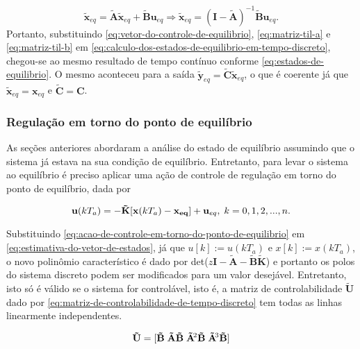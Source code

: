 \begin{equation}
    \label{eq:calculo-dos-estados-de-equilibrio-em-tempo-discreto}
    \mathbf{\tilde{x}}_{eq} = \mathbf{\tilde{A}}\mathbf{\tilde{x}}_{eq} + \mathbf{\tilde{B}}\mathbf{u}_{eq}
    \Rightarrow
    \mathbf{\tilde{x}}_{eq} = (\mathbf{I}-\mathbf{\tilde{A}})^{-1}\mathbf{\tilde{B}}\mathbf{u}_{eq}.
\end{equation} Portanto, substituindo \ref{eq:vetor-do-controle-de-equilibrio},
\ref{eq:matriz-til-a} e \ref{eq:matriz-til-b} em
\ref{eq:calculo-dos-estados-de-equilibrio-em-tempo-discreto}, chegou-se ao mesmo
resultado de tempo contínuo conforme \ref{eq:estados-de-equilibrio}. O mesmo
aconteceu para a saída $\mathbf{\tilde{y}}_{eq} =
\mathbf{\tilde{C}}\mathbf{\tilde{x}}_{eq}$, o que é coerente já que
$\mathbf{\tilde{x}}_{eq} = \mathbf{x}_{eq}$ e $\mathbf{\tilde{C}} = \mathbf{C}$.

\subsubsection{Regulação em torno do ponto de equilíbrio}
\label{subsub:regulacao-em-torno-do-ponto-de-equilibrio}

As seções anteriores abordaram a análise do estado de equilíbrio assumindo que o
sistema já estava na sua condição de equilíbrio. Entretanto, para levar o sistema
ao equilíbrio é preciso aplicar uma ação de controle de regulação em torno do
ponto de equilíbrio, dada por

\begin{equation}
    \label{eq:acao-de-controle-em-torno-do-ponto-de-equilibrio}
    \mathbf{u}(kT_a) = -\mathbf{\tilde{K}}[\mathbf{x}(kT_a) - \mathbf{x_{eq}}]+\mathbf{u}_{eq}, 
    \thickspace k = 0, 1, 2, ..., n.
\end{equation}

Substituindo \ref{eq:acao-de-controle-em-torno-do-ponto-de-equilibrio} em
\ref{eq:estimativa-do-vetor-de-estados}, já que $u[k] := u(kT_a)$ e $x[k] :=
x(kT_a)$, o novo polinômio característico é dado por
det($z\mathbf{I}-\mathbf{\tilde{A}}-\mathbf{\tilde{B}}\mathbf{\tilde{K}}$) e
portanto os polos do sistema discreto podem ser modificados para um valor
desejável. Entretanto, isto só é válido se o sistema for controlável, isto é, a
matriz de controlabilidade $\mathbf{\tilde{U}}$ dado por
\ref{eq:matriz-de-controlabilidade-de-tempo-discreto} tem todas as linhas
linearmente independentes.

\begin{equation}
    \label{eq:matriz-de-controlabilidade-de-tempo-discreto}
    \mathbf{\tilde{U}} = [
    \mathbf{\tilde{B}}
    \thickspace
    \mathbf{\tilde{A}\tilde{B}} 
    \thickspace
    \mathbf{\tilde{A}}\negthinspace^{2}\mathbf{\tilde{B}}
    \thickspace
    \mathbf{\tilde{A}}\negthinspace^{3}\mathbf{\tilde{B}}]
\end{equation}

